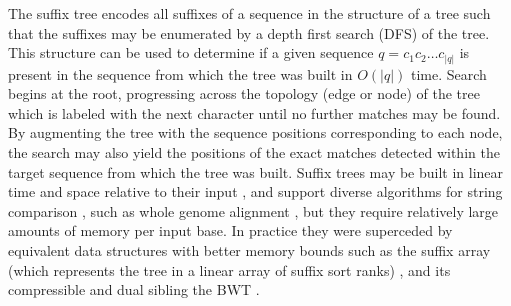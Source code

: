 The suffix tree \cite{weiner1973linear} encodes all suffixes of a sequence in the structure of a tree such that the suffixes may be enumerated by a depth first search (DFS) of the tree.
This structure can be used to determine if a given sequence $q = c_{1}c_{2}\ldots c_{|q|}$ is present in the sequence from which the tree was built in $O(|q|)$ time.
Search begins at the root, progressing across the topology (edge or node) of the tree which is labeled with the next character until no further matches may be found.
By augmenting the tree with the sequence positions corresponding to each node, the search may also yield the positions of the exact matches detected within the target sequence from which the tree was built.
Suffix trees may be built in linear time and space relative to their input \cite{ukkonen1995line}, and support diverse algorithms for string comparison \cite{apostolico1985myriad}, such as whole genome alignment \cite{delcher1999alignment}, but they require relatively large amounts of memory per input base.
In practice they were superceded by equivalent data structures with better memory bounds such as the suffix array (which represents the tree in a linear array of suffix sort ranks) \cite{manber1993suffix}, and its compressible and dual sibling the BWT \cite{burrows1994block}.

